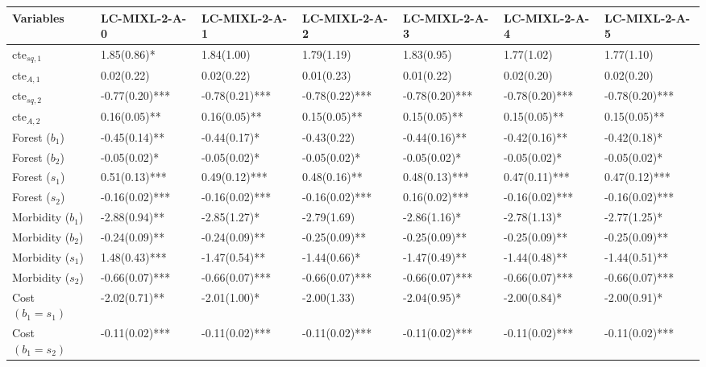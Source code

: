 \begin{tabular}{lllllll}
  \hline
Variables & LC-MIXL-2-A-0 & LC-MIXL-2-A-1 & LC-MIXL-2-A-2 & LC-MIXL-2-A-3 & LC-MIXL-2-A-4 & LC-MIXL-2-A-5 \\ 
  \hline
cte$_{sq,1}$ &  1.85(0.86)*   &  1.84(1.00)    &  1.79(1.19)    &  1.83(0.95)    &  1.77(1.02)    &  1.77(1.10)    \\ 
  cte$_{A ,1}$ &  0.02(0.22)    &  0.02(0.22)    &  0.01(0.23)    &  0.01(0.22)    &  0.02(0.20)    &  0.02(0.20)    \\ 
  cte$_{sq,2}$ & -0.77(0.20)*** & -0.78(0.21)*** & -0.78(0.22)*** & -0.78(0.20)*** & -0.78(0.20)*** & -0.78(0.20)*** \\ 
  cte$_{A ,2}$ &  0.16(0.05)**  &  0.16(0.05)**  &  0.15(0.05)**  &  0.15(0.05)**  &  0.15(0.05)**  &  0.15(0.05)**  \\ 
  Forest  ($b_1$) & -0.45(0.14)**  & -0.44(0.17)*   & -0.43(0.22)    & -0.44(0.16)**  & -0.42(0.16)**  & -0.42(0.18)*   \\ 
  Forest  ($b_2$) & -0.05(0.02)*   & -0.05(0.02)*   & -0.05(0.02)*   & -0.05(0.02)*   & -0.05(0.02)*   & -0.05(0.02)*   \\ 
  Forest  ($s_1$) &  0.51(0.13)*** &  0.49(0.12)*** &  0.48(0.16)**  &  0.48(0.13)*** &  0.47(0.11)*** &  0.47(0.12)*** \\ 
  Forest  ($s_2$) & -0.16(0.02)*** & -0.16(0.02)*** & -0.16(0.02)*** &  0.16(0.02)*** & -0.16(0.02)*** & -0.16(0.02)*** \\ 
  Morbidity ($b_1$) & -2.88(0.94)**  & -2.85(1.27)*   & -2.79(1.69)    & -2.86(1.16)*   & -2.78(1.13)*   & -2.77(1.25)*   \\ 
  Morbidity ($b_2$) & -0.24(0.09)**  & -0.24(0.09)**  & -0.25(0.09)**  & -0.25(0.09)**  & -0.25(0.09)**  & -0.25(0.09)**  \\ 
  Morbidity ($s_1$) &  1.48(0.43)*** & -1.47(0.54)**  & -1.44(0.66)*   & -1.47(0.49)**  & -1.44(0.48)**  & -1.44(0.51)**  \\ 
  Morbidity ($s_2$) & -0.66(0.07)*** & -0.66(0.07)*** & -0.66(0.07)*** & -0.66(0.07)*** & -0.66(0.07)*** & -0.66(0.07)*** \\ 
  Cost $(b_1 = s_1)$ & -2.02(0.71)**  & -2.01(1.00)*   & -2.00(1.33)    & -2.04(0.95)*   & -2.00(0.84)*   & -2.00(0.91)*   \\ 
  Cost $(b_1 = s_2)$ & -0.11(0.02)*** & -0.11(0.02)*** & -0.11(0.02)*** & -0.11(0.02)*** & -0.11(0.02)*** & -0.11(0.02)*** \\ 

\end{tabular}
